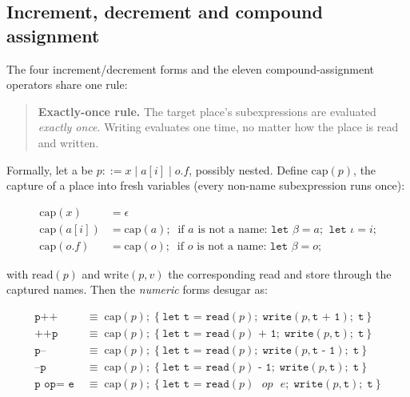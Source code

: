 \subsection{Increment, decrement and compound assignment}
\label{sec:exactly-once}

The four increment/decrement forms and the eleven compound-assignment
operators share one rule:

\begin{quote}
\textbf{Exactly-once rule.} The target place's subexpressions are
evaluated \emph{exactly once}. Writing  evaluates
 one time, no matter how the place is read and written.
\end{quote}

\noindent Formally, let a  be $p ::= x \mid a[i] \mid o.f$,
possibly nested. Define $\mathrm{cap}(p)$, the capture of a place into
fresh variables (every non-name subexpression runs once):

\begin{align*}
\mathrm{cap}(x) &= \epsilon \\
\mathrm{cap}(a[i]) &= \mathrm{cap}(a);
   \;\; \text{if } a \text{ is not a name: } \texttt{let } \beta = a \texttt{;}
   \;\; \texttt{let } \iota = i \texttt{;} \\
\mathrm{cap}(o.f) &= \mathrm{cap}(o);
   \;\; \text{if } o \text{ is not a name: } \texttt{let } \beta = o \texttt{;}
\end{align*}

\noindent with $\mathrm{read}(p)$ and $\mathrm{write}(p, v)$ the
corresponding read and store through the captured names. Then the
\emph{numeric} forms desugar as:

\begin{align*}
\texttt{p++} &\;\equiv\; \mathrm{cap}(p);\;\texttt{\{}~\texttt{let t = read}(p)\texttt{;}
   ~~\texttt{write}(p, \texttt{t + 1})\texttt{;}~~\texttt{t}~\texttt{\}} \\
\texttt{++p} &\;\equiv\; \mathrm{cap}(p);\;\texttt{\{}~\texttt{let t = read}(p)\texttt{ + 1;}
   ~~\texttt{write}(p, \texttt{t})\texttt{;}~~\texttt{t}~\texttt{\}} \\
\texttt{p--} &\;\equiv\; \mathrm{cap}(p);\;\texttt{\{}~\texttt{let t = read}(p)\texttt{;}
   ~~\texttt{write}(p, \texttt{t - 1})\texttt{;}~~\texttt{t}~\texttt{\}} \\
\texttt{--p} &\;\equiv\; \mathrm{cap}(p);\;\texttt{\{}~\texttt{let t = read}(p)\texttt{ - 1;}
   ~~\texttt{write}(p, \texttt{t})\texttt{;}~~\texttt{t}~\texttt{\}} \\[4pt]
\texttt{p op= e} &\;\equiv\; \mathrm{cap}(p);\;\texttt{\{}~\texttt{let t = read}(p)
   \texttt{ } op \texttt{ } e\texttt{;}~~\texttt{write}(p, \texttt{t})\texttt{;}~~\texttt{t}~\texttt{\}}
\end{align*}

